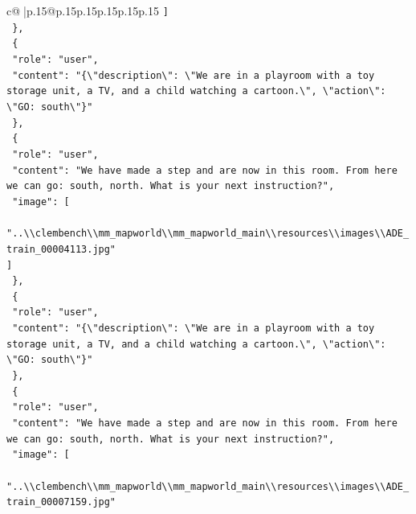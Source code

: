 \documentclass{article}
\begin{document}
{\begin{supertabular}{c@{$\;$}|p{.15\linewidth}@{}p{.15\linewidth}p{.15\linewidth}p{.15\linewidth}p{.15\linewidth}p{.15\linewidth}}
{{{\texttt{    {]}} \\
\texttt{  \},} \\
\texttt{  \{} \\
\texttt{    "role": "user",} \\
\texttt{    "content": "\{\textbackslash{}"description\textbackslash{}": \textbackslash{}"We are in a playroom with a toy storage unit, a TV, and a child watching a cartoon.\textbackslash{}", \textbackslash{}"action\textbackslash{}": \textbackslash{}"GO: south\textbackslash{}"\}"} \\
\texttt{  \},} \\
\texttt{  \{} \\
\texttt{    "role": "user",} \\
\texttt{    "content": "We have made a step and are now in this room. From here we can go: south, north. What is your next instruction?",} \\
\texttt{    "image": {[}} \\
\texttt{      "..\textbackslash{}\textbackslash{}clembench\textbackslash{}\textbackslash{}mm\_mapworld\textbackslash{}\textbackslash{}mm\_mapworld\_main\textbackslash{}\textbackslash{}resources\textbackslash{}\textbackslash{}images\textbackslash{}\textbackslash{}ADE\_train\_00004113.jpg"} \\
\texttt{    {]}} \\
\texttt{  \},} \\
\texttt{  \{} \\
\texttt{    "role": "user",} \\
\texttt{    "content": "\{\textbackslash{}"description\textbackslash{}": \textbackslash{}"We are in a playroom with a toy storage unit, a TV, and a child watching a cartoon.\textbackslash{}", \textbackslash{}"action\textbackslash{}": \textbackslash{}"GO: south\textbackslash{}"\}"} \\
\texttt{  \},} \\
\texttt{  \{} \\
\texttt{    "role": "user",} \\
\texttt{    "content": "We have made a step and are now in this room. From here we can go: south, north. What is your next instruction?",} \\
\texttt{    "image": {[}} \\
\texttt{      "..\textbackslash{}\textbackslash{}clembench\textbackslash{}\textbackslash{}mm\_mapworld\textbackslash{}\textbackslash{}mm\_mapworld\_main\textbackslash{}\textbackslash{}resources\textbackslash{}\textbackslash{}images\textbackslash{}\textbackslash{}ADE\_train\_00007159.jpg"} \\
}}}
\end{supertabular}}
\end{document}
